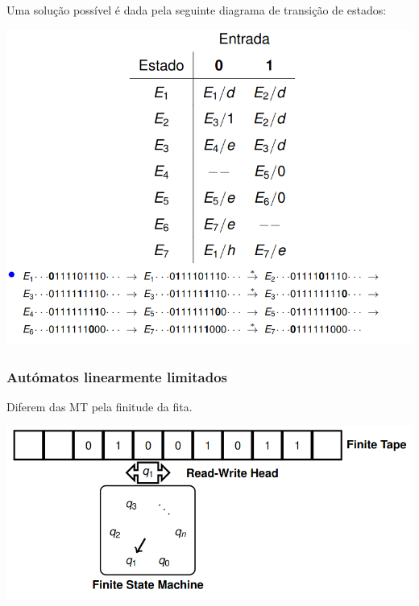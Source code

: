 \documentclass{article}
\begin{document}
\pagebreak

\begin{flushleft}
  Uma solução possível é dada pela seguinte diagrama de
  transição de estados:

  \begin{center}
    \includegraphics[scale=0.35]{16}
  \end{center}
\end{flushleft}

\subsubsection{Autómatos linearmente limitados}

\begin{flushleft}
  Diferem das MT pela finitude da fita.

  \begin{center}
    \includegraphics[scale=0.35]{17}
  \end{center}
\end{flushleft}
\end{document}
